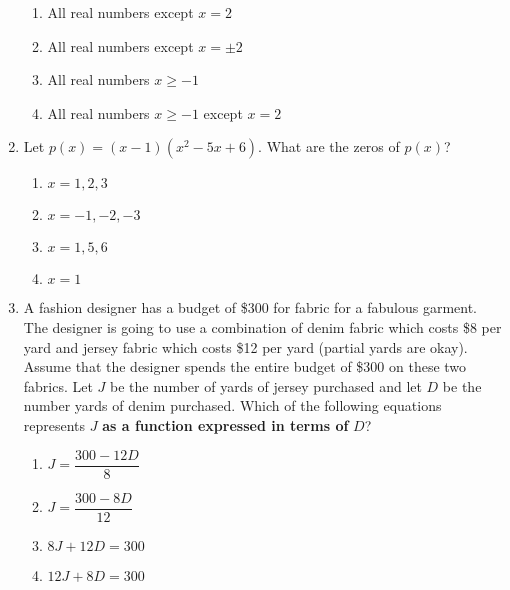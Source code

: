 \documentclass{article}
\begin{document}
\begin{enumerate}
  \begin{enumerate}
  
  
  \item All real numbers except $x=2$ %
  \item All real numbers except $x=\pm 2$ %
  \item All real numbers $x \geq -1$ %
  \item All real numbers $x \geq -1$ except $x=2$ %
  \end{enumerate}

 
 
\item Let $p(x)=(x-1)(x^2-5x+6)$. What are the zeros of $p(x)$?

  \begin{enumerate}
  
  
  \item $x= 1, 2, 3 $ %
  \item $x= -1, -2, -3 $ %
   \item $x= 1, 5, 6$ %
  \item $x= 1$ %
  \end{enumerate}
 



\item A fashion designer has a budget of \$300 for fabric for a fabulous garment. The
designer is going to use a combination of denim fabric which costs \$8 per yard and jersey fabric which costs \$12 per yard (partial yards are okay). Assume that the designer spends the entire budget of \$300 on these two fabrics. Let $J$ be the number of yards of jersey purchased and let $D$ be the number yards of denim purchased. Which of the following equations represents $J$ \textbf{as a function expressed in terms of} $D$?

  \begin{enumerate}
  
 

  \item $J = \dfrac{300-12D}{8}$ %
   \item $J = \dfrac{300-8D}{12}$ %
    \item $8J + 12D = 300$ %
  \item $12J + 8D = 300$ %
  \end{enumerate}


\end{enumerate}
\end{document}
